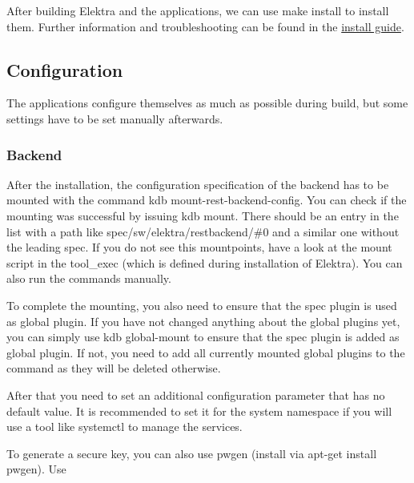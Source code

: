 After building Elektra and the applications, we can use {\ttfamily make install} to install them. Further information and troubleshooting can be found in the \hyperlink{doc_INSTALL_md}{install guide}.

\subsection*{Configuration}

The applications configure themselves as much as possible during build, but some settings have to be set manually afterwards.

\subsubsection*{Backend}

After the installation, the configuration specification of the backend has to be mounted with the command {\ttfamily kdb mount-\/rest-\/backend-\/config}. You can check if the mounting was successful by issuing {\ttfamily kdb mount}. There should be an entry in the list with a path like {\ttfamily spec/sw/elektra/restbackend/\#0} and a similar one without the leading {\ttfamily spec}. If you do not see this mountpoints, have a look at the mount script in the tool\+\_\+exec (which is defined during installation of Elektra). You can also run the commands manually.

To complete the mounting, you also need to ensure that the {\ttfamily spec} plugin is used as global plugin. If you have not changed anything about the global plugins yet, you can simply use {\ttfamily kdb global-\/mount} to ensure that the {\ttfamily spec} plugin is added as global plugin. If not, you need to add all currently mounted global plugins to the command as they will be deleted otherwise.

After that you need to set an additional configuration parameter that has no default value. It is recommended to set it for the system namespace if you will use a tool like {\ttfamily systemctl} to manage the services.




To generate a secure key, you can also use {\ttfamily pwgen} (install via {\ttfamily apt-\/get install pwgen}). Use




